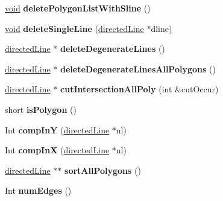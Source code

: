 \begin{DoxyCompactItemize}
\hyperlink{interfacevoid}{void} {\bfseries delete\+Polygon\+List\+With\+Sline} ()
\item 
\mbox{\label{classdirected_line_a73613c9f966959441d3fbdce23af5dc9}} 
\hyperlink{interfacevoid}{void} {\bfseries delete\+Single\+Line} (\hyperlink{classdirected_line}{directed\+Line} $\ast$dline)
\item 
\mbox{\label{classdirected_line_a4ea003bcac4ce58ed2e548e3855aed48}} 
\hyperlink{classdirected_line}{directed\+Line} $\ast$ {\bfseries delete\+Degenerate\+Lines} ()
\item 
\mbox{\label{classdirected_line_ac0b52e516e3b88eb28fc6152587246e5}} 
\hyperlink{classdirected_line}{directed\+Line} $\ast$ {\bfseries delete\+Degenerate\+Lines\+All\+Polygons} ()
\item 
\mbox{\label{classdirected_line_a6160844b49c88fff4d043118cad9ca67}} 
\hyperlink{classdirected_line}{directed\+Line} $\ast$ {\bfseries cut\+Intersection\+All\+Poly} (int \&cut\+Occur)
\item 
\mbox{\label{classdirected_line_ad20d10314ffbccef4064a7e2f52eeac4}} 
short {\bfseries is\+Polygon} ()
\item 
\mbox{\label{classdirected_line_a9bb81f8a20a9c000e855e5efa0bf2e47}} 
Int {\bfseries comp\+InY} (\hyperlink{classdirected_line}{directed\+Line} $\ast$nl)
\item 
\mbox{\label{classdirected_line_a8ed6799b8310bed26809fe854a1efa93}} 
Int {\bfseries comp\+InX} (\hyperlink{classdirected_line}{directed\+Line} $\ast$nl)
\item 
\mbox{\label{classdirected_line_a59d84721235022f13eb849a3e66ddee6}} 
\hyperlink{classdirected_line}{directed\+Line} $\ast$$\ast$ {\bfseries sort\+All\+Polygons} ()
\item 
\mbox{\label{classdirected_line_a2320d56f428681b345aec06e060509e5}} 
Int {\bfseries num\+Edges} ()
\item 
\mbox{\label{classdirected_line_afcbb4089cd08f391fe938fd6cb6bcbad}} 
$$
\end{DoxyCompactItemize}

